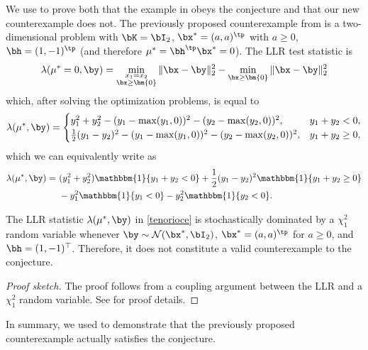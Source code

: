 \documentclass[11pt]{article}
\numberwithin{equation}{section}
\numberwithin{figure}{section}
\begin{document}
We use  to prove both that the example in \cite{tenorio2007confidence} obeys the conjecture and that our new counterexample does not. 
The previously proposed counterexample from \cite{tenorio2007confidence} is a two-dimensional problem with $\bK = \bI_2$, $\bx^* = (a,a)^\tp$ with $a \geq 0$, $\bh = (1,-1)^\tp$ (and therefore $\mu^* = \bh^\tp \bx^* = 0$).
The LLR test statistic is 
\begin{equation*}
\lambda(\mu^* = 0, \by) = \min_{\substack{x_1 = x_2 \\ \bx \geq \bm{0}}} \Vert \bx -\by \Vert^2_2 - \min_{\bx \geq \bm{0} } \Vert \bx-\by \Vert^2_2 
\end{equation*}
which, after solving the optimization problems, is equal to  
\begin{equation*}
\lambda(\mu^*, \by) = 
  \begin{cases} 
     y_1^2 + y_2^2 -(y_1 - \max(y_1, 0))^2 - (y_2 - \max(y_2, 0))^2, & y_1 + y_2 < 0, \\
    \frac 1 2 (y_1-y_2)^2 -(y_1 - \max(y_1, 0))^2 - (y_2 - \max(y_2, 0))^2, &  y_1 + y_2 \geq 0,
    \end{cases}
\end{equation*}
which we can equivalently write as 
\begin{align}\label{tenorioce}
    \lambda(\mu^*, \by) =\ & (y_1^2 + y_2^2)\mathbbm{1}\{y_1+y_2 < 0\} + \frac 1 2 (y_1-y_2)^2 \mathbbm{1}\{y_1+y_2 \geq 0\} \\&- y_1^2 \mathbbm{1}\{y_1<0\} -y_2^2\mathbbm{1}\{y_2 < 0\}.\notag
\end{align}
\begin{lemma}
    \label{lemma:invalidity-counterexample}
    The LLR statistic $\lambda(\mu^*, \by)$ in \eqref{tenorioce} is stochastically dominated by a $\chi^2_1$ random variable whenever $\by \sim \mathcal N(\bx^*, \bI_2)$, $\bx^* = (a, a)^\tp$ for $a \ge 0$, and $\bh = (1, -1)^\top$. 
    Therefore, it does not constitute a valid counterexample to the conjecture.
\end{lemma}
\begin{proof}[Proof sketch]
The proof follows from a coupling argument between the LLR and a $\chi^2_1$ random variable. 
See  for proof details.
\end{proof}

In summary, we used  to demonstrate that the previously proposed counterexample actually satisfies the conjecture.
\end{document}
